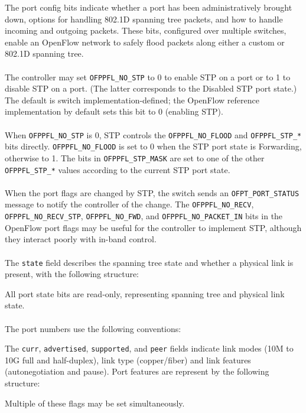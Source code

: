 
The port config bits indicate whether a port has been administratively brought down, options for handling 802.1D spanning tree packets, and how to handle incoming and outgoing packets.   These bits, configured over multiple switches, enable an OpenFlow network to safely flood packets along either a custom or 802.1D spanning tree.
\\\\
The controller may set \verb|OFPPFL_NO_STP| to 0 to enable STP on a port or to 1 to disable STP on a port. (The latter corresponds to the Disabled STP port state.) The default is switch implementation-defined; the OpenFlow reference implementation by default sets this bit to 0 (enabling STP).
\\\\
When \verb|OFPPFL_NO_STP| is 0, STP controls the \verb|OFPPFL_NO_FLOOD| and \verb|OFPPFL_STP_*| bits directly. \verb|OFPPFL_NO_FLOOD| is set to 0 when the STP port state is Forwarding, otherwise to 1. The bits in \verb|OFPPFL_STP_MASK| are set to one of the other \verb|OFPPFL_STP_*| values according to the current STP port state.
\\\\
When the port flags are changed by STP, the switch sends an \verb|OFPT_PORT_STATUS| message to notify the controller of the change. The \verb|OFPPFL_NO_RECV|, \verb|OFPPFL_NO_RECV_STP|, \verb|OFPPFL_NO_FWD|, and \verb|OFPPFL_NO_PACKET_IN| bits in the OpenFlow port flags may be useful for the controller to implement STP, although they interact poorly with in-band control. 
\\\\
The \verb|state| field describes the spanning tree state and whether a physical link is present, with the following structure:


All port state bits are read-only, representing spanning tree and physical link state.
\\\\
The port numbers use the following conventions:


The \verb|curr|, \verb|advertised|, \verb|supported|, and \verb|peer| fields indicate link modes (10M to 10G full and half-duplex), link type (copper/fiber) and link features (autonegotiation and pause).  Port features are represent by the following structure:


Multiple of these flags may be set simultaneously.

